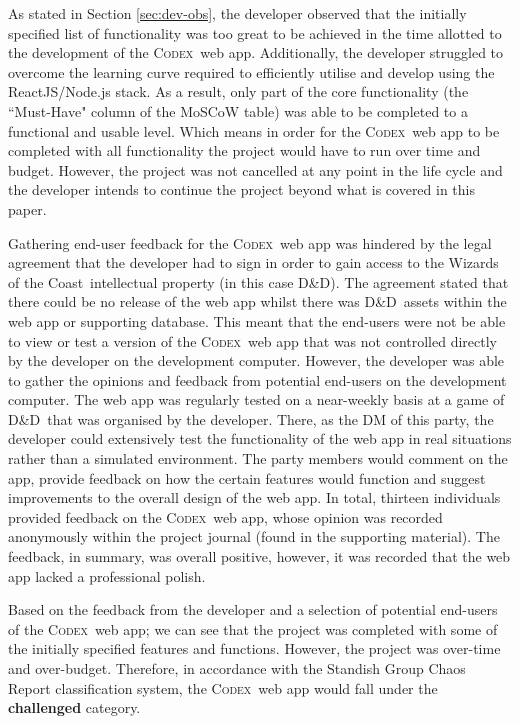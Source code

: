 \documentclass[final]{cmpreport}
\newcommand{\WotC}{Wizards of the Coast}
\newcommand{\dnd}{D\&D}
\newcommand{\Codex}{\textsc{Codex}}
\begin{document}
		As stated in Section \ref{sec:dev-obs}, the developer observed that the initially specified list of functionality was too great to be achieved in the time allotted to the development of the \Codex \ web app. Additionally, the developer struggled to overcome the learning curve required to efficiently utilise and develop using the ReactJS/Node.js stack. As a result, only part of the core functionality (the ``Must-Have" column of the MoSCoW table) was able to be completed to a functional and usable level. Which means in order for the \Codex \ web app to be completed with all functionality the project would have to run over time and budget. However, the project was not cancelled at any point in the life cycle and the developer intends to continue the project beyond what is covered in this paper. 
	
		Gathering end-user feedback for the \Codex \ web app was hindered by the legal agreement that the developer had to sign in order to gain access to the \WotC \ intellectual property (in this case \dnd). The agreement stated that there could be no release of the web app whilst there was \dnd \ assets within the web app or supporting database. This meant that the end-users were not be able to view or test a version of the \Codex \ web app that was not controlled directly by the developer on the development computer. However, the developer was able to gather the opinions and feedback from potential end-users on the development computer. The web app was regularly tested on a near-weekly basis at a game of \dnd \ that was organised by the developer. There, as the DM of this party, the developer could extensively test the functionality of the web app in real situations rather than a simulated environment. The party members would comment on the app, provide feedback on how the certain features would function and suggest improvements to the overall design of the web app. In total, thirteen individuals provided feedback on the \Codex \ web app, whose opinion was recorded anonymously within the project journal (found in the supporting material). The feedback, in summary, was overall positive, however, it was recorded that the web app lacked a professional polish.  
	
		Based on the feedback from the developer and a selection of potential end-users of the \Codex \ web app; we can see that the project was completed with some of the initially specified features and functions. However, the project was over-time and over-budget. Therefore, in accordance with the Standish Group Chaos Report classification system, the \Codex \ web app would fall under the \textbf{challenged} category.
		
\end{document}
